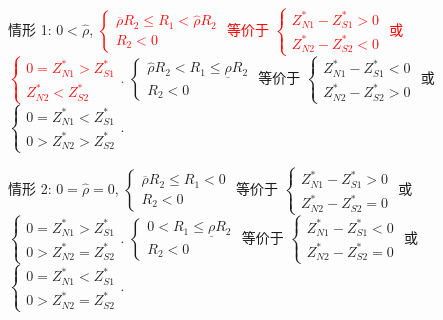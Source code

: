 \documentclass[10.0pt]{article}
\newcommand{\hhred}{\textcolor{red}}
\begin{document}
情形 1: $ 0 < {\hat \rho} $, \hhred{$ \left\{ \begin{matrix} \overline{\rho} R_2 \leqslant R_1 < {\hat \rho} R_2 \\ R_2 < 0 \end{matrix} \right. $ 等价于 $ \left\{ \begin{matrix} Z_{N 1}^* - Z_{S 1}^* > 0 \\ Z_{N 2}^* - Z_{S 2}^* < 0 \end{matrix} \right. $ 或 $ \left\{ \begin{matrix} 0 = Z_{N 1}^* > Z_{S 1}^* \\ Z_{N 2}^* < Z_{S 2}^* \end{matrix} \right. $.} $ \left\{ \begin{matrix} {\hat \rho} R_2 < R_1 \leqslant \underline{\rho} R_2 \\ R_2 < 0 \end{matrix} \right. $ 等价于 $ \left\{ \begin{matrix} Z_{N 1}^* - Z_{S 1}^* < 0 \\ Z_{N 2}^* - Z_{S 2}^* > 0 \end{matrix} \right. $ 或 $ \left\{ \begin{matrix} 0 = Z_{N 1}^* < Z_{S 1}^* \\ 0 > Z_{N 2}^* > Z_{S 2}^* \end{matrix} \right. $.

情形 2: $ 0 = {\hat \rho} = 0 $, $ \left\{ \begin{matrix} \overline{\rho} R_2 \leqslant R_1 < 0 \\ R_2 < 0 \end{matrix} \right. $ 等价于 $ \left\{ \begin{matrix} Z_{N 1}^* - Z_{S 1}^* > 0 \\ Z_{N 2}^* - Z_{S 2}^* = 0 \end{matrix} \right. $ 或 $ \left\{ \begin{matrix} 0 = Z_{N 1}^* > Z_{S 1}^* \\ 0 > Z_{N 2}^* = Z_{S 2}^* \end{matrix} \right. $. $ \left\{ \begin{matrix} 0 < R_1 \leqslant \underline{\rho} R_2 \\ R_2 < 0 \end{matrix} \right. $ 等价于 $ \left\{ \begin{matrix} Z_{N 1}^* - Z_{S 1}^* < 0 \\ Z_{N 2}^* - Z_{S 2}^* = 0 \end{matrix} \right. $ 或 $ \left\{ \begin{matrix} 0 = Z_{N 1}^* < Z_{S 1}^* \\ 0 > Z_{N 2}^* = Z_{S 2}^* \end{matrix} \right. $.
\end{document}
